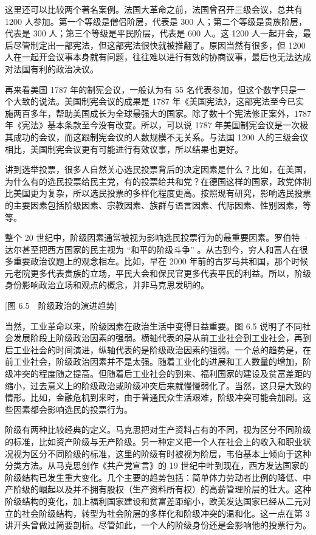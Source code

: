 这里还可以比较两个著名案例。法国大革命之前，法国曾召开三级会议，总共有 1200 人参加。第一个等级是僧侣阶层，代表是 300 人；第二个等级是贵族阶层，代表是 300 人；第三个等级是平民阶层，代表是 600 人。这 1200 人一起开会，最后尽管制定出一部宪法，但这部宪法很快就被推翻了。原因当然有很多，但 1200 人在一起开会议事本身就有问题，往往难以进行有效的协商议事，最后也无法达成对法国有利的政治决议。

再来看美国 1787 年的制宪会议，一般认为有 55 名代表参加，但这个数字只是一个大致的说法。美国制宪会议的成果是 1787 年《美国宪法》，这部宪法至今已实施两百多年，帮助美国成长为全球最强大的国家。除了数十个宪法修正案外，1787 年《宪法》基本条款至今没有改变。所以，可以说 1787 年美国制宪会议是一次极其成功的会议，而这跟制宪会议的人数规模不无关系。与法国 1200 人的三级会议相比，美国制宪会议更有可能进行有效议事，所以结果也更好。

讲到选举投票，很多人自然关心选民投票背后的决定因素是什么？比如，在美国，为什么有的选民投票给民主党，有的投票给共和党？在德国这样的国家，政党体制比美国更为复杂，所以选民投票的多样化程度更高。按照现有研究，影响选民投票的主要因素包括阶级因素、宗教因素、族群与语言因素、代际因素、性别因素，等等。

整个 20 世纪中，阶级因素通常被视为影响选民投票行为的最重要因素。罗伯特 · 达尔甚至把西方国家的民主视为 “和平的阶级斗争” 。从古到今，穷人和富人在很多重要政治议题上的观念相左。比如，早在 2000 年前的古罗马共和国，那个时候元老院更多代表贵族的立场，平民大会和保民官更多代表平民的利益。所以，阶级身份影响政治立场和观点的概念，并非马克思发明的。

[图 6.5　阶级政治的演进趋势]

当然，工业革命以来，阶级因素在政治生活中变得日益重要。图 6.5 说明了不同社会发展阶段上阶级政治因素的强弱。横轴代表的是从前工业社会到工业社会，再到后工业社会的时间演进，纵轴代表的是阶级政治因素的强弱。一个总的趋势是，在前工业社会，阶级政治因素并不是太强。随着工业化的进展和工人数量的增加，阶级冲突的程度随之提高。但随着后工业社会的到来、福利国家的建设及贫富差距的缩小，过去意义上的阶级政治或阶级冲突后来就慢慢弱化了。当然，这只是大致的情形。比如，金融危机到来时，由于普通民众生活艰难，阶级冲突可能会加剧。这些因素都会影响选民的投票行为。

阶级有两种比较经典的定义。马克思把对生产资料占有的不同，视为区分不同阶级的标准，比如资产阶级与无产阶级。另一种定义把一个人在社会上的收入和职业状况视为区分不同阶级的标准，这里的阶级有时被视为阶层，韦伯基本上倾向于这种分类方法。从马克思创作《共产党宣言》的 19 世纪中叶到现在，西方发达国家的阶级结构已发生重大变化。几个主要的趋势包括：简单体力劳动者比例的降低、中产阶级的崛起以及并不拥有股权（生产资料所有权）的高薪管理阶层的壮大。这种阶级结构的变化，加上福利国家建设和贫富差距缩小，欧美发达国家已经从二元对立的社会阶级结构，转型为社会阶层的多样化和阶级冲突的温和化。这一点在第 3 讲开头曾做过简要剖析。尽管如此，一个人的阶级身份还是会影响他的投票行为。

